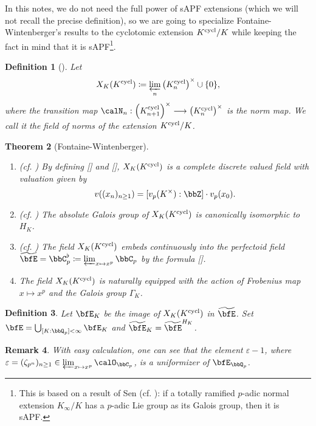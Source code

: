 \documentclass[a4paper,oneside]{amsart}
\newtheorem{theorem}{Theorem}[section]
\newtheorem{remark}[theorem]{Remark}
\newtheorem{definition}[theorem]{Definition}
\numberwithin{equation}{section}
\numberwithin{figure}{section}
\begin{document}
In this notes, we do not need the full power of sAPF extensions (which we will not recall the precise definition), so we are going to specialize Fontaine-Wintenberger's results to the cyclotomic extension $K^{\operatorname{cycl}}/K$ while keeping the fact in mind that it is sAPF\footnote{This is based on a result of Sen (cf. \cite{sen_ramification_1972}): if a totally ramified $p$-adic normal extension $K_\infty/K$ has a $p$-adic Lie group as its Galois group, then it is sAPF.}.
\begin{definition}[{\cite[Section 2.1.1]{wintenberger_corps_1983}}]
    Let $$X_K(K^{\operatorname{cycl}})\coloneqq\varprojlim_n \left(K_n^{\operatorname{cycl}}\right)^\times\cup\{0\},$$
    where the transition map $\calN_n:\left(K_{n+1}^{\opn{cycl}}\right)^\times\lto \left(K_n^{\opn{cycl}}\right)^\times$ is the norm map. We call it the field of norms of the extension $K^{\operatorname{cycl}}/K$.
\end{definition}
\begin{theorem}[Fontaine-Wintenberger]\leavevmode
    \begin{enumerate}
        \item (cf. \cite[Th\'eor\`eme 2.1.3]{wintenberger_corps_1983}) By defining [] and [], $X_K(K^{\operatorname{cycl}})$ is a complete discrete valued field with valuation given by
              $$v((x_n)_{n\geq 1})=[v_p(K^\times):\bbZ]\cdot v_p(x_0).$$
        \item (cf. \cite[Corollaire 3.2.3]{wintenberger_corps_1983}) The absolute Galois group of $X_K(K^{\operatorname{cycl}})$ is canonically isomorphic to $H_K$.
        \item (cf. \cite[Proposition 4.2.1]{wintenberger_corps_1983}) The field $X_K(K^{\operatorname{cycl}})$ embeds continuously into the perfectoid field $\widetilde{\bfE}=\bbC_p^\flat\coloneqq \varprojlim_{x\mapsto x^p}\bbC_p$ by the formula [].
        \item The field $X_K(K^{\operatorname{cycl}})$ is naturally equipped with the action of Frobenius map $x\mapsto x^p$ and the Galois group $\Gamma_K$.
    \end{enumerate}
\end{theorem}
\begin{definition}
    Let $\bfE_K$ be the image of $X_K(K^{\operatorname{cycl}})$ in $\widetilde{\bfE}$. Set $\bfE=\bigcup_{[K:\bbQ_p]<\infty}\bfE_K$ and $\widetilde{\bfE}_K=\widetilde{\bfE}^{H_K}$.
\end{definition}
\begin{remark}
    With easy calculation, one can see that the element $\varepsilon-1$, where $\varepsilon=(\zeta_{p^n})_{n\geq 1}\in \varprojlim_{x\mapsto x^p}\calO_{\bbC_p}$, is a uniformizer of $\bfE_{\bbQ_p}$.
\end{remark}
\end{document}
